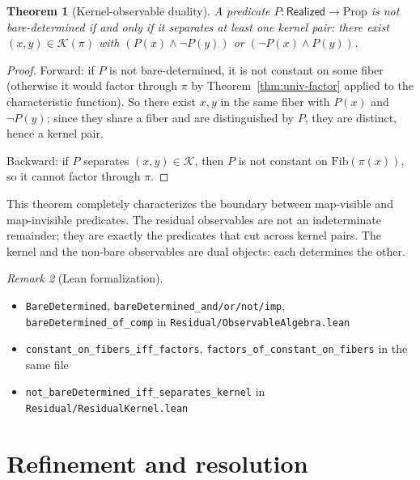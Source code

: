 \documentclass[11pt,a4paper]{article}
\theoremstyle{plain}
\newtheorem{theorem}{Theorem}[section]
\theoremstyle{definition}
\theoremstyle{remark}
\newtheorem{remark}[theorem]{Remark}
\newcommand{\Real}{\mathsf{Realized}}
\newcommand{\compare}{\pi}
\newcommand{\Fib}{\mathrm{Fib}}
\newcommand{\Ker}{\mathcal{K}}
\begin{document}
\begin{theorem}[Kernel-observable duality]\label{thm:duality}
A predicate $P : \Real \to \mathrm{Prop}$ is not bare-determined
if and only if it separates at least one kernel pair: there exist
$(x,y) \in \Ker(\compare)$ with $(P(x) \land \lnot P(y))$ or
$(\lnot P(x) \land P(y))$.
\end{theorem}

\begin{proof}
Forward: if $P$ is not bare-determined, it is not constant on some fiber
(otherwise it would factor through $\compare$ by Theorem~\ref{thm:univ-factor}
applied to the characteristic function). So there exist $x, y$ in the same
fiber with $P(x)$ and $\lnot P(y)$; since they share a fiber and are
distinguished by $P$, they are distinct, hence a kernel pair.

Backward: if $P$ separates $(x,y) \in \Ker$, then $P$ is not constant on
$\Fib(\compare(x))$, so it cannot factor through $\compare$.
\end{proof}

This theorem completely characterizes the boundary between
map-visible and map-invisible predicates. The residual
observables are not an indeterminate remainder; they are exactly the
predicates that cut across kernel pairs. The kernel and the non-bare
observables are dual objects: each determines the other.

\begin{remark}[Lean formalization]
\leavevmode\par\begin{itemize}[nosep,leftmargin=*,before=\raggedright]
\item \texttt{BareDetermined}, \texttt{bareDetermined\_and/or/not/imp}, \texttt{bareDetermined\_of\_comp} in \texttt{Residual/ObservableAlgebra.lean}
\item \texttt{constant\_on\_fibers\_iff\_factors}, \texttt{factors\_of\_constant\_on\_fibers} in the same file
\item \texttt{not\_bareDetermined\_iff\_separates\_kernel} in \texttt{Residual/ResidualKernel.lean}
\end{itemize}
\end{remark}

\section{Refinement and resolution}\label{sec:refinement}
\end{document}
